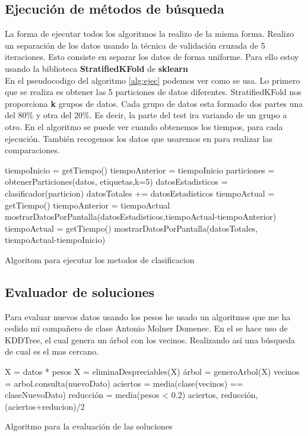 \documentclass[12pt,a4paper]{article}
\begin{document}
\subsection{Ejecución de métodos de búsqueda}
La forma de ejecutar todos los algoritmos la realizo de la misma forma. Realizo un separación de los datos usando la técnica de validación cruzada de 5 iteraciones. Esto consiste en separar los datos de forma uniforme. Para ello estoy usando la biblioteca \textbf{StratifiedKFold} de \textbf{sklearn}\cite{Baz}\\
En el pseudocodigo del algoritmo \ref{alg:ejec} podemos ver  como se usa. Lo primero que se realiza es obtener las 5 particiones de datos diferentes. StratifiedKFold nos proporciona \textbf{k} grupos de datos. Cada grupo de datos esta formado dos partes una del 80\% y otra del 20\%. Es decir, la parte del test ira variando de un grupo a otro. En el algoritmo  se puede ver cuando obtenemos los tiempos, para cada ejecución. También recogemos los datos que usaremos en para realizar las comparaciones.
\begin{algorithm}[H]
	\begin{algorithmic}[1]
		\State tiempoInicio = getTiempo()
		\State tiempoAnterior = tiempoInicio
		\State particiones = obtenerParticiones(datos, etiquetas,k=5)
		\State datosEstadisticos = clasificador(particion)
		\State datosTotales += datosEstadisticos
		\State tiempoActual = getTiempo()
		\State tiempoAnterior = tiempoActual
		\State mostrarDatosPorPantalla(datosEstadisticos,tiempoActual-tiempoAnterior)
		\EndFor
		\State tiempoActual = getTiempo()
		\State mostrarDatosPorPantalla(datosTotales, tiempoActual-tiempoInicio)
	\end{algorithmic}
	\label{alg:ejec}
	\caption{Algoritom para ejecutar los metodos de clasificacion}
\end{algorithm}
\subsection{Evaluador de soluciones}
Para evaluar nuevos datos usando los pesos he usado un algoritmos que me ha cedido mi compañero de clase Antonio Molner Domenec. En el se hace uso de KDDTree, el cual genera un árbol con los vecinos. Realizando así una búsqueda de cual es el mas cercano. 
\begin{algorithm}[H]
	\begin{algorithmic}[1]
		\State X = datos * pesos
		\State X = eliminaDespreciables(X)
		\State árbol = generoArbol(X)
		\State vecinos = arbol.consulta(nuevoDato)
		\State aciertos = media(clase(vecinos) == claseNuevoDato)
		\State reducción = media(pesos < 0.2)
		\State \Return aciertos, reducción, (aciertos+reducion)/2
	
	\end{algorithmic}
	\label{alg:ejec}
	\caption{Algoritmo para la evaluación de las soluciones}
\end{algorithm}
\end{document}
